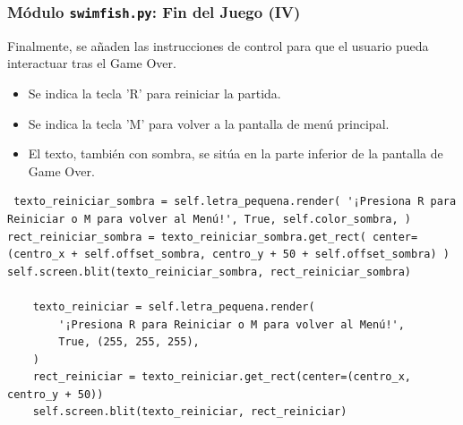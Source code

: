 \documentclass[
	11pt, %
]{beamer}
\begin{document}

\begin{frame}[fragile] \frametitle{Módulo \texttt{swimfish.py}: Fin del Juego (IV)}

Finalmente, se añaden las instrucciones de control para que el usuario pueda interactuar tras el Game Over.

\begin{itemize} \item Se indica la tecla 'R' para reiniciar la partida. \item Se indica la tecla 'M' para volver a la pantalla de menú principal. \item El texto, también con sombra, se sitúa en la parte inferior de la pantalla de Game Over. \end{itemize}

\vspace{4pt} {\scriptsize \begin{verbatim} texto_reiniciar_sombra = self.letra_pequena.render( '¡Presiona R para Reiniciar o M para volver al Menú!', True, self.color_sombra, ) rect_reiniciar_sombra = texto_reiniciar_sombra.get_rect( center=(centro_x + self.offset_sombra, centro_y + 50 + self.offset_sombra) ) self.screen.blit(texto_reiniciar_sombra, rect_reiniciar_sombra)

    texto_reiniciar = self.letra_pequena.render(
        '¡Presiona R para Reiniciar o M para volver al Menú!',
        True, (255, 255, 255),
    )
    rect_reiniciar = texto_reiniciar.get_rect(center=(centro_x, centro_y + 50))
    self.screen.blit(texto_reiniciar, rect_reiniciar)
\end{verbatim} } \end{frame}

\end{document}
